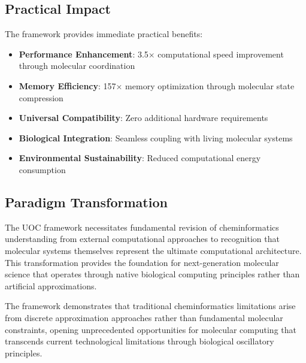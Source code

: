 \documentclass[12pt,a4paper]{article}
\begin{document}
\subsection{Practical Impact}

The framework provides immediate practical benefits:

\begin{itemize}
\item \textbf{Performance Enhancement}: 3.5× computational speed improvement through molecular coordination
\item \textbf{Memory Efficiency}: 157× memory optimization through molecular state compression
\item \textbf{Universal Compatibility}: Zero additional hardware requirements
\item \textbf{Biological Integration}: Seamless coupling with living molecular systems
\item \textbf{Environmental Sustainability}: Reduced computational energy consumption
\end{itemize}

\subsection{Paradigm Transformation}

The UOC framework necessitates fundamental revision of cheminformatics understanding from external computational approaches to recognition that molecular systems themselves represent the ultimate computational architecture. This transformation provides the foundation for next-generation molecular science that operates through native biological computing principles rather than artificial approximations.

The framework demonstrates that traditional cheminformatics limitations arise from discrete approximation approaches rather than fundamental molecular constraints, opening unprecedented opportunities for molecular computing that transcends current technological limitations through biological oscillatory principles.
\end{document}
